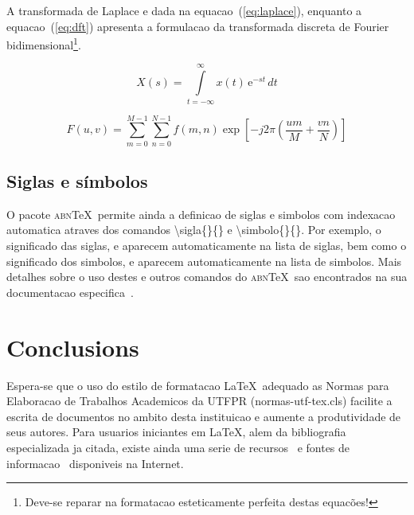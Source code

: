 \documentclass[openright]{normas-utf-tex} %
\begin{document}
A transformada de Laplace e dada na equacao~(\ref{eq:laplace}), enquanto a equacao~(\ref{eq:dft}) apresenta a formulacao da transformada discreta de Fourier bidimensional\footnote{Deve-se reparar na formatacao esteticamente perfeita destas equac\~oes!}.

\begin{equation}
X(s) = \int\limits_{t = -\infty}^{\infty} x(t) \, \text{e}^{-st} \, dt
\label{eq:laplace}
\end{equation}

\begin{equation}
F(u, v) = \sum_{m = 0}^{M - 1} \sum_{n = 0}^{N - 1} f(m, n) \exp \left[ -j 2 \pi \left( \frac{u m}{M} + \frac{v n}{N} \right) \right]
\label{eq:dft}
\end{equation}

\section{Siglas e símbolos}

O pacote \textsc{abn}\TeX\ permite ainda a definicao de siglas e simbolos com indexacao automatica atraves dos comandos {\ttfamily \textbackslash sigla\{\}\{\}} e {\ttfamily \textbackslash simbolo\{\}\{\}}. Por exemplo, o significado das siglas, e aparecem automaticamente na lista de siglas, bem como o significado dos simbolos, e aparecem automaticamente na lista de simbolos. Mais detalhes sobre o uso destes e outros comandos do \textsc{abn}\TeX\ sao encontrados na sua documentacao especifica~\cite{abnTeX2009}.


\chapter{Conclusions}

Espera-se que o uso do estilo de formatacao \LaTeX\ adequado as Normas para Elaboracao de Trabalhos Academicos da UTFPR ({\ttfamily normas-utf-tex.cls}) facilite a escrita de documentos no ambito desta instituicao e aumente a produtividade de seus autores. Para usuarios iniciantes em \LaTeX, alem da bibliografia especializada ja citada, existe ainda uma serie de recursos~\cite{CTAN2009} e fontes de informacao~\cite{TeX-Br2009,Wikibooks2009} disponiveis na Internet.
\end{document}
